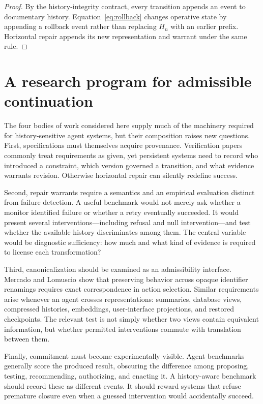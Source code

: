 \documentclass[11pt]{article}
\begin{document}
\begin{proof}
By the history-integrity contract, every transition appends an event to documentary history. Equation~\eqref{eq:rollback} changes operative state by appending a rollback event rather than replacing $H_n$ with an earlier prefix. Horizontal repair appends its new representation and warrant under the same rule.
\end{proof}

\section{A research program for admissible continuation}

The four bodies of work considered here supply much of the machinery required for history-sensitive agent systems, but their composition raises new questions. First, specifications must themselves acquire provenance. Verification papers commonly treat requirements as given, yet persistent systems need to record who introduced a constraint, which version governed a transition, and what evidence warrants revision. Otherwise horizontal repair can silently redefine success.

Second, repair warrants require a semantics and an empirical evaluation distinct from failure detection. A useful benchmark would not merely ask whether a monitor identified failure or whether a retry eventually succeeded. It would present several interventions---including refusal and null intervention---and test whether the available history discriminates among them. The central variable would be diagnostic sufficiency: how much and what kind of evidence is required to license each transformation?

Third, canonicalization should be examined as an admissibility interface. Mercado and Lomuscio show that preserving behavior across opaque identifier renamings requires exact correspondence in action selection. Similar requirements arise whenever an agent crosses representations: summaries, database views, compressed histories, embeddings, user-interface projections, and restored checkpoints. The relevant test is not simply whether two views contain equivalent information, but whether permitted interventions commute with translation between them.

Finally, commitment must become experimentally visible. Agent benchmarks generally score the produced result, obscuring the difference among proposing, testing, recommending, authorizing, and enacting it. A history-aware benchmark should record these as different events. It should reward systems that refuse premature closure even when a guessed intervention would accidentally succeed.
\end{document}

